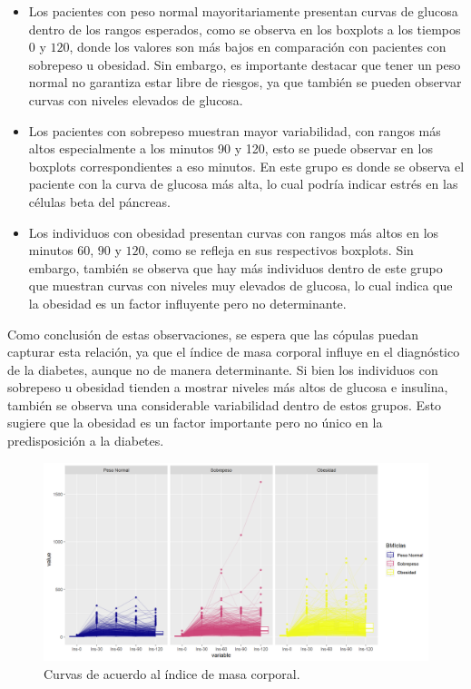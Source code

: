 \begin{itemize}
    \item Los pacientes con peso normal mayoritariamente presentan curvas de glucosa dentro de los rangos esperados, como se observa en los boxplots a los tiempos $0$ y $120$, donde los valores son más bajos en comparación con pacientes con sobrepeso u obesidad. Sin embargo, es importante destacar que tener un peso normal no garantiza estar libre de riesgos, ya que también se pueden observar curvas con niveles elevados de glucosa.

    \item Los pacientes con sobrepeso muestran mayor variabilidad, con rangos más altos especialmente a los minutos 90 y 120, esto se puede observar en los boxplots correspondientes a eso minutos. En este grupo es donde se observa el paciente con la curva de glucosa más alta, lo cual podría indicar estrés en las células beta del páncreas.

    \item Los individuos con obesidad presentan curvas con rangos más altos en los minutos $60$, $90$ y $120$, como se refleja en sus respectivos boxplots.  Sin embargo, también se observa que hay más individuos dentro de este grupo que muestran curvas con niveles muy elevados de glucosa, lo cual indica que la obesidad es un factor influyente pero no determinante.
\end{itemize}

Como conclusión de estas observaciones, se espera que las cópulas puedan capturar esta relación, ya que el índice de masa corporal influye en el diagnóstico de la diabetes, aunque no de manera determinante. Si bien los individuos con sobrepeso u obesidad tienden a mostrar niveles más altos de glucosa e insulina, también se observa una considerable variabilidad dentro de estos grupos. Esto sugiere que la obesidad es un factor importante pero no único en la predisposición a la diabetes.


\begin{figure}[H]
    \centering
    \includegraphics[width = 0.9 \textwidth]{Imagenes/insCurvasBMI.png}
    \caption{Curvas de acuerdo al índice de masa corporal.}
    \label{fig:CurvasInsIBM}
\end{figure}

